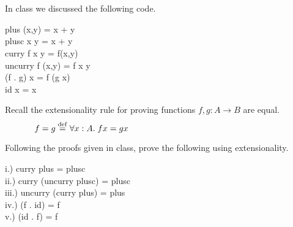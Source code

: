 \documentclass[11pt]{article}
\begin{document}

\section{}

\noindent{}In class we discussed the following code.

\begin{program**}
\>     plus (x,y) = x + y \\
\>     plusc x y = x + y \\
\>     curry f x y  =  f(x,y) \\
\>     uncurry f (x,y) = f x y \\
\>     (f . g) x = f (g x) \\
\>     id x = x \\
\end{program**}

\noindent{}Recall the extensionality rule for proving functions $f,g:A\rightarrow{}B$ are equal.
\[ f = g \;{\stackrel{\rm def}{=}}\; \forall{}x:A. \;f x = g x \hspace{2.5in} \]

\noindent{}Following the proofs given in class, prove the following using extensionality.

\begin{program**}
\>       {\rm{i.)}}  curry  plus = plusc \\
\>       {\rm{ii.)}}  curry (uncurry  plusc) = plusc \\
\>       {\rm{iii.)}}  uncurry (curry  plus) = plus \\
\>       {\rm{iv.)}}  (f . id) = f \\
\>       {\rm{v.)}}  (id . f) = f 
\end{program**}
\end{document}
